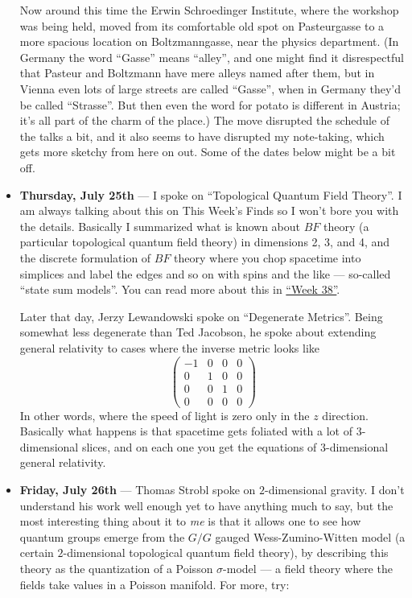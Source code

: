 \documentclass{article}
\begin{document}
\begin{itemize}
  Now around this time the Erwin Schroedinger Institute, where the
  workshop was being held, moved from its comfortable old spot on
  Pasteurgasse to a more spacious location on Boltzmanngasse, near the
  physics department. (In Germany the word ``Gasse'' means ``alley'',
  and one might find it disrespectful that Pasteur and Boltzmann have
  mere alleys named after them, but in Vienna even lots of large streets
  are called ``Gasse'', when in Germany they'd be called ``Strasse''.
  But then even the word for potato is different in Austria; it's all
  part of the charm of the place.) The move disrupted the schedule of
  the talks a bit, and it also seems to have disrupted my note-taking,
  which gets more sketchy from here on out. Some of the dates below
  might be a bit off.
\item
  \textbf{Thursday, July 25th} --- I spoke on ``Topological Quantum
  Field Theory''. I am always talking about this on This Week's Finds so
  I won't bore you with the details. Basically I summarized what is
  known about \(BF\) theory (a particular topological quantum field
  theory) in dimensions 2, 3, and 4, and the discrete formulation of
  \(BF\) theory where you chop spacetime into simplices and label the
  edges and so on with spins and the like --- so-called ``state sum
  models''. You can read more about this in
  \protect\hyperlink{week38}{``Week 38''}.

  Later that day, Jerzy Lewandowski spoke on ``Degenerate Metrics''.
  Being somewhat less degenerate than Ted Jacobson, he spoke about
  extending general relativity to cases where the inverse metric looks
  like \[
      \left(
        \begin{array}{cccc}
          -1&0&0&0
        \\0&1&0&0
        \\0&0&1&0
        \\0&0&0&0
        \end{array}
      \right)
    \] In other words, where the speed of light is zero only in the
  \(z\) direction. Basically what happens is that spacetime gets
  foliated with a lot of \(3\)-dimensional slices, and on each one you
  get the equations of \(3\)-dimensional general relativity.
\item
  \textbf{Friday, July 26th} --- Thomas Strobl spoke on
  \(2\)-dimensional gravity. I don't understand his work well enough yet
  to have anything much to say, but the most interesting thing about it
  to \emph{me} is that it allows one to see how quantum groups emerge
  from the \(G/G\) gauged Wess-Zumino-Witten model (a certain
  \(2\)-dimensional topological quantum field theory), by describing
  this theory as the quantization of a Poisson \(\sigma\)-model --- a
  field theory where the fields take values in a Poisson manifold. For
  more, try:


\end{itemize}
\end{document}
